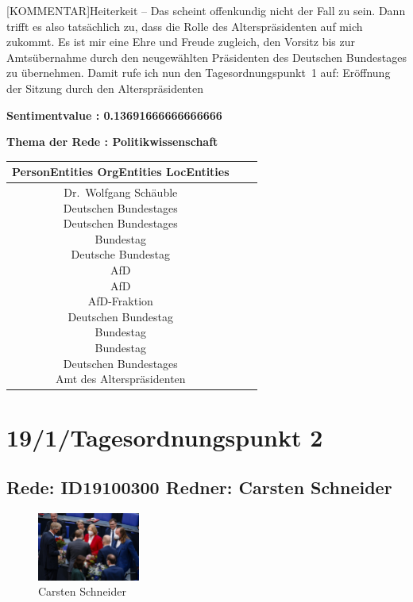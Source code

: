 \documentclass[a4paper,11pt]{article}
\begin{document}
[KOMMENTAR]Heiterkeit
– Das scheint offenkundig nicht der Fall zu sein. Dann trifft es also tatsächlich zu, dass die Rolle des Alterspräsidenten auf mich zukommt. Es ist mir eine Ehre und Freude zugleich, den Vorsitz bis zur Amtsübernahme durch den neugewählten Präsidenten des Deutschen Bundestages zu übernehmen. Damit rufe ich nun den Tagesordnungspunkt 1 auf: Eröffnung der Sitzung durch den Alterspräsidenten

\textbf{Sentimentvalue : 0.13691666666666666}

\textbf{Thema der Rede : Politikwissenschaft}
\vspace*{1cm}

\begin{table}[ht]
\centering
\begin{tabular}{||c | c | c||}
\hline
PersonEntities  OrgEntities  LocEntities \\ 

\hline\hline
\makecell{Dr. Wolfgang Schäuble \\
} 
\makecell{Deutschen Bundestages \\
Deutschen Bundestages \\
Bundestag \\
Deutsche Bundestag \\
AfD \\
AfD \\
AfD-Fraktion \\
Deutschen Bundestag \\
Bundestag \\
Bundestag \\
Deutschen Bundestages \\
} 
\makecell{Amt des Alterspräsidenten \\
}\\
\hline
\end{tabular}
\end{table}
\clearpage


\section{19/1/Tagesordnungspunkt 2} 

\subsection{Rede: ID19100300  Redner: Carsten Schneider}

\begin{figure}[ht]

\centering

\includegraphics[width=0.3\textwidth]{Carsten_Schneider.jpg}

\caption{Carsten Schneider}

\end{figure}
\end{document}
